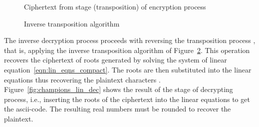 \documentclass[10pt,journal]{IEEEtran}
\begin{document}
\begin{figure}[h]
\centering 
{}
\caption{Ciphertext from  stage (transposition) of encryption process}
\label{fig:champions_tr_enc}
\end{figure}

\begin{figure}[h]
\centering 
{}
\caption{Inverse transposition algorithm}
\label{fig:inv_transposition_algo}
\end{figure}

The inverse decryption process proceeds with reversing the
transposition process , that is, applying the
inverse transposition algorithm of
Figure~\ref{fig:inv_transposition_algo}. This operation recovers the
ciphertext of roots generated by solving the system of linear
equation~\ref{eqn:lin_eqns_compact}. The roots are then substituted
into the linear equations thus recovering the plaintext characters
.  Figure~\ref{fig:champions_lin_dec} shows the result of the
 stage of decrypting process, i.e., inserting the roots of the
ciphertext into the linear equations to get the ascii-code. The
resulting real numbers must be rounded to recover the plaintext.
\end{document}
